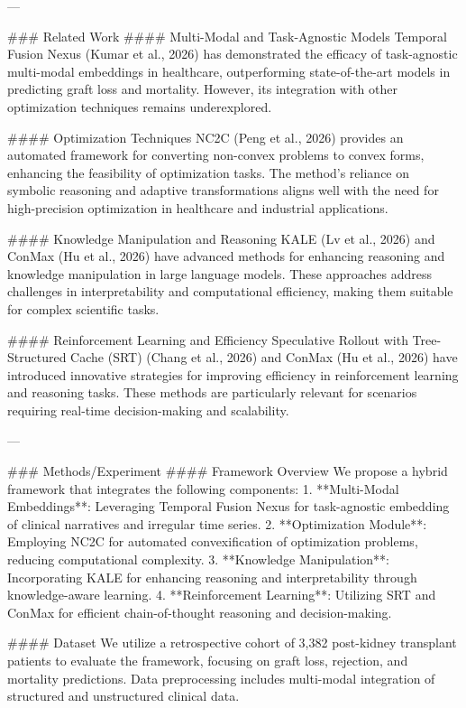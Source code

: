---

### Related Work
#### Multi-Modal and Task-Agnostic Models
Temporal Fusion Nexus (Kumar et al., 2026) has demonstrated the efficacy of task-agnostic multi-modal embeddings in healthcare, outperforming state-of-the-art models in predicting graft loss and mortality. However, its integration with other optimization techniques remains underexplored.

#### Optimization Techniques
NC2C (Peng et al., 2026) provides an automated framework for converting non-convex problems to convex forms, enhancing the feasibility of optimization tasks. The method's reliance on symbolic reasoning and adaptive transformations aligns well with the need for high-precision optimization in healthcare and industrial applications.

#### Knowledge Manipulation and Reasoning
KALE (Lv et al., 2026) and ConMax (Hu et al., 2026) have advanced methods for enhancing reasoning and knowledge manipulation in large language models. These approaches address challenges in interpretability and computational efficiency, making them suitable for complex scientific tasks.

#### Reinforcement Learning and Efficiency
Speculative Rollout with Tree-Structured Cache (SRT) (Chang et al., 2026) and ConMax (Hu et al., 2026) have introduced innovative strategies for improving efficiency in reinforcement learning and reasoning tasks. These methods are particularly relevant for scenarios requiring real-time decision-making and scalability.

---

### Methods/Experiment
#### Framework Overview
We propose a hybrid framework that integrates the following components:
1. **Multi-Modal Embeddings**: Leveraging Temporal Fusion Nexus for task-agnostic embedding of clinical narratives and irregular time series.
2. **Optimization Module**: Employing NC2C for automated convexification of optimization problems, reducing computational complexity.
3. **Knowledge Manipulation**: Incorporating KALE for enhancing reasoning and interpretability through knowledge-aware learning.
4. **Reinforcement Learning**: Utilizing SRT and ConMax for efficient chain-of-thought reasoning and decision-making.

#### Dataset
We utilize a retrospective cohort of 3,382 post-kidney transplant patients to evaluate the framework, focusing on graft loss, rejection, and mortality predictions. Data preprocessing includes multi-modal integration of structured and unstructured clinical data.

